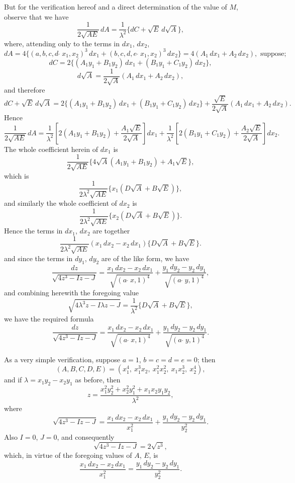 \documentclass[11pt,a4paper]{article}
\begin{document}
But for the verification hereof and a direct determination of the value of $M$, observe that we have
\[
\frac{1}{2\sqrt{AE}}\,dA = \frac{1}{\lambda^2}\{dC + \sqrt{E}\,d\sqrt{A}\},
\]
where, attending only to the terms in $dx_1$, $dx_2$,
\[
dA = 4\{(a, b, c, d \,\check{\,}\, x_1, x_2)^3\,dx_1 + (b, c, d, e \,\check{\,}\, x_1, x_2)^3\,dx_2\} = 4(A_1\,dx_1 + A_2\,dx_2), \text{ suppose};
\]
\[
dC = 2\{(A_1y_1 + B_1y_2)\,dx_1 + (B_1y_1 + C_1y_2)\,dx_2\},
\]
\[
d\sqrt{A} = \frac{1}{2\sqrt{A}}(A_1\,dx_1 + A_2\,dx_2),
\]
and therefore
\[
dC + \sqrt{E}\,d\sqrt{A} = 2\{(A_1y_1 + B_1y_2)\,dx_1 + (B_1y_1 + C_1y_2)\,dx_2\} + \frac{\sqrt{E}}{2\sqrt{A}}(A_1\,dx_1 + A_2\,dx_2).
\]
Hence
\[
\frac{1}{2\sqrt{AE}}\,dA = \frac{1}{\lambda^2}\left[2(A_1y_1 + B_1y_2) + \frac{A_1\sqrt{E}}{2\sqrt{A}}\right]dx_1 + \frac{1}{\lambda^2}\left[2(B_1y_1 + C_1y_2) + \frac{A_2\sqrt{E}}{2\sqrt{A}}\right]dx_2.
\]
The whole coefficient herein of $dx_1$ is
\[
\frac{1}{2\sqrt{AE}}\{4\sqrt{A}(A_1y_1 + B_1y_2) + A_1\sqrt{E}\},
\]
which is
\[
\frac{1}{2\lambda^2\sqrt{AE}}\{x_1(D\sqrt{A} + B\sqrt{E})\},
\]
and similarly the whole coefficient of $dx_2$ is
\[
\frac{1}{2\lambda^2\sqrt{AE}}\{x_2(D\sqrt{A} + B\sqrt{E})\}.
\]
Hence the terms in $dx_1$, $dx_2$ are together
\[
\frac{1}{2\lambda^2\sqrt{AE}}(x_1\,dx_2 - x_2\,dx_1)\{D\sqrt{A} + B\sqrt{E}\}.
\]
and since the terms in $dy_1$, $dy_2$ are of the like form, we have
\[
\frac{dz}{\sqrt{4z^3 - Iz - J}} = \frac{x_1\,dx_2 - x_2\,dx_1}{\sqrt{(a\,\check{\,}\,x, 1)^4}} + \frac{y_1\,dy_2 - y_2\,dy_1}{\sqrt{(a\,\check{\,}\,y, 1)^4}},
\]
and combining herewith the foregoing value
\[
\sqrt{4\lambda^3z - I\lambda z - J} = \frac{1}{\lambda^2}\{D\sqrt{A} + B\sqrt{E}\},
\]
we have the required formula
\[
\frac{dz}{\sqrt{4z^3 - Iz - J}} = \frac{x_1\,dx_2 - x_2\,dx_1}{\sqrt{(a\,\check{\,}\,x, 1)^4}} + \frac{y_1\,dy_2 - y_2\,dy_1}{\sqrt{(a\,\check{\,}\,y, 1)^4}}.
\]

As a very simple verification, suppose $a = 1$, $b = c = d = e = 0$; then
\[
(A, B, C, D, E) = (x_1^4,\ x_1^3x_2,\ x_1^2x_2^2,\ x_1x_2^3,\ x_2^4),
\]
and if $\lambda = x_1y_2 - x_2y_1$ as before, then
\[
z = \frac{x_1^2y_2^2 + x_2^2y_1^2 + x_1x_2y_1y_2}{\lambda^2},
\]
where
\[
\sqrt{4z^3 - Iz - J} = \frac{x_1\,dx_2 - x_2\,dx_1}{x_1^2} + \frac{y_1\,dy_2 - y_2\,dy_1}{y_2^2}.
\]
Also $I = 0$, $J = 0$, and consequently
\[
\sqrt{4z^3 - Iz - J} = 2\sqrt{z^3},
\]
which, in virtue of the foregoing values of $A$, $E$, is
\[
\frac{x_1\,dx_2 - x_2\,dx_1}{x_1^2} = \frac{y_1\,dy_2 - y_2\,dy_1}{y_2^2}.
\]
\end{document}
